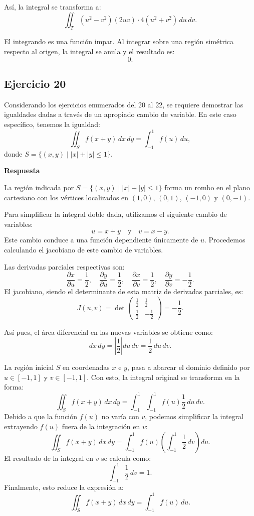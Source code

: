 \documentclass{report}
\begin{document}
Así, la integral se transforma a:
\[
\iint_{T} (u^2 - v^2)(2uv) \cdot 4(u^2 + v^2) \, du \, dv.
\]

El integrando es una función impar. Al integrar sobre una región simétrica respecto al origen, la integral se anula y el resultado es:
\[
\boxed{0}.
\]\subsection{Ejercicio 20}
Considerando los ejercicios enumerados del 20 al 22, se requiere demostrar las igualdades dadas a través de un apropiado cambio de variable. En este caso específico, tenemos la igualdad: 
\[
\iint_{S} f(x+y) \, dx \, dy = \int_{-1}^{1} f(u) \, du,
\]
donde $S = \{(x, y) \mid |x| + |y| \leq 1\}$.

\textbf{Respuesta}

La región indicada por $S = \{(x, y) \mid |x| + |y| \leq 1\}$ forma un rombo en el plano cartesiano con los vértices localizados en $(1, 0)$, $(0, 1)$, $(-1, 0)$ y $(0, -1)$. 

Para simplificar la integral doble dada, utilizamos el siguiente cambio de variables:
\[
u = x + y \quad \text{y} \quad v = x - y.
\]
Este cambio conduce a una función dependiente únicamente de $u$. Procedemos calculando el jacobiano de este cambio de variables.

Las derivadas parciales respectivas son:
\[
\frac{\partial x}{\partial u} = \frac{1}{2}, \quad \frac{\partial y}{\partial u} = \frac{1}{2}, \quad \frac{\partial x}{\partial v} = \frac{1}{2}, \quad \frac{\partial y}{\partial v} = -\frac{1}{2}.
\]
El jacobiano, siendo el determinante de esta matriz de derivadas parciales, es:
\[
J(u, v) = \det \begin{pmatrix} 
\frac{1}{2} & \frac{1}{2} \\
\frac{1}{2} & -\frac{1}{2}
\end{pmatrix} = -\frac{1}{2}.
\]

Así pues, el área diferencial en las nuevas variables se obtiene como:
\[
dx \, dy = \left|\frac{1}{2}\right| du \, dv = \frac{1}{2} \, du \, dv.
\]

La región inicial $S$ en coordenadas $x$ e $y$, pasa a abarcar el dominio definido por $u \in [-1, 1]$ y $v \in [-1, 1]$. Con esto, la integral original se transforma en la forma:
\[
\iint_{S} f(x + y) \, dx \, dy = \int_{-1}^{1} \int_{-1}^{1} f(u) \frac{1}{2} \, du \, dv.
\]
Debido a que la función $f(u)$ no varía con $v$, podemos simplificar la integral extrayendo $f(u)$ fuera de la integración en $v$:
\[
\iint_{S} f(x + y) \, dx \, dy = \int_{-1}^{1} f(u) \left( \int_{-1}^{1} \frac{1}{2} \, dv \right) du.
\]
El resultado de la integral en $v$ se calcula como:
\[
\int_{-1}^{1} \frac{1}{2} \, dv = 1.
\]
Finalmente, esto reduce la expresión a:
\[
\iint_{S} f(x + y) \, dx \, dy = \int_{-1}^{1} f(u) \, du.
\]
\end{document}
